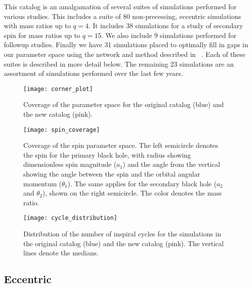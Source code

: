 \documentclass[
twocolumn,prd,
showpacs,
nofootinbib,
amsmath,amssymb,
superscriptaddress]{revtex4-1}
\begin{document}
This catalog is an amalgamation of several suites of simulations performed for various studies.
This includes a suite of 80 non-precessing, eccentric simulations with mass ratios up to $q=4$.
It includes 38 simulations for a study of secondary spin for mass ratios up to $q=15$.
We also include 9 simulations performed for \lvk{} followup studies.
Finally we have 31 simulations placed to optimally fill in gaps in our parameter space using the network and method described in ~\cite{Ferguson:2022qkz}. 
Each of these suites is described in more detail below.
The remaining 23 simulations are an assortment of simulations performed over the last few years.

\begin{figure*}
  \centering
  \texttt{[image: corner\_plot]}
  \caption{Coverage of the parameter space for the original catalog (blue) and the new catalog (pink). }
  \label{fig:parameter_space}
\end{figure*}

\begin{figure}
  \centering
  \texttt{[image: spin\_coverage]}
  \caption{Coverage of the spin parameter space. The left semicircle denotes the spin for the primary black hole, with radius showing dimensionless spin magnitude ($a_1$) and the angle from the vertical showing the angle between the spin and the orbital angular momentum ($\theta_1$). The same applies for the secondary black hole ($a_2$ and $\theta_2$), shown on the right semicircle. The color denotes the mass ratio. }
  \label{fig:spin_coverage}
\end{figure}

\begin{figure}
  \centering
  \texttt{[image: cycle\_distribution]}
  \caption{Distribution of the number of inspiral \gw{} cycles for the simulations in the original catalog (blue) and the new catalog (pink).  The vertical lines denote the medians.}
  \label{fig:cycles}
\end{figure}

\subsection{Eccentric}\label{sec:eccentric}
\end{document}
